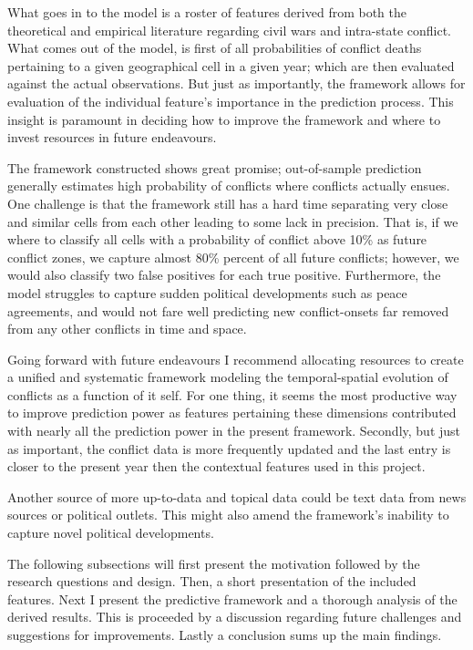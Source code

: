 \documentclass[a4paper]{article}
\begin{document}
What goes in to the model is a roster of features derived from both the theoretical and empirical literature regarding civil wars and intra-state conflict. What comes out of the model, is first of all probabilities of conflict deaths pertaining to a given geographical cell in a given year; which are then evaluated against the actual observations. But just as importantly, the framework allows for evaluation of the individual feature's importance in the prediction process. This insight is paramount in deciding how to improve the framework and where to invest resources in future endeavours.\par

The framework constructed shows great promise; out-of-sample prediction generally estimates high probability of conflicts where conflicts actually ensues. One challenge is that the framework still has a hard time separating very close and similar cells from each other leading to some lack in precision. That is, if we where to classify all cells with a probability of conflict above 10\% as future conflict zones, we capture almost 80\% percent of all future conflicts; however, we would also classify two false positives for each true positive. Furthermore, the model struggles to capture sudden political developments such as peace agreements, and would not fare well predicting new conflict-onsets far removed from any other conflicts in time and space.\par

Going forward with future endeavours I recommend allocating resources to create a unified and systematic framework modeling the temporal-spatial evolution of conflicts as a function of it self. For one thing, it seems the most productive way to improve prediction power as features pertaining these dimensions contributed with nearly all the prediction power in the present framework. Secondly, but just as important, the conflict data is more frequently updated and the last entry is closer to the present year then the contextual features used in this project.\par

Another source of more up-to-data and topical data could be text data from news sources or political outlets. This might also amend the framework's inability to capture novel political developments.\par

The following subsections will first present the motivation followed by the research questions and design. Then, a short presentation of the included features. Next I present the predictive framework and a thorough analysis of the derived results. This is proceeded by a discussion regarding future challenges and suggestions for improvements. Lastly a conclusion sums up the main findings.\par
\end{document}
